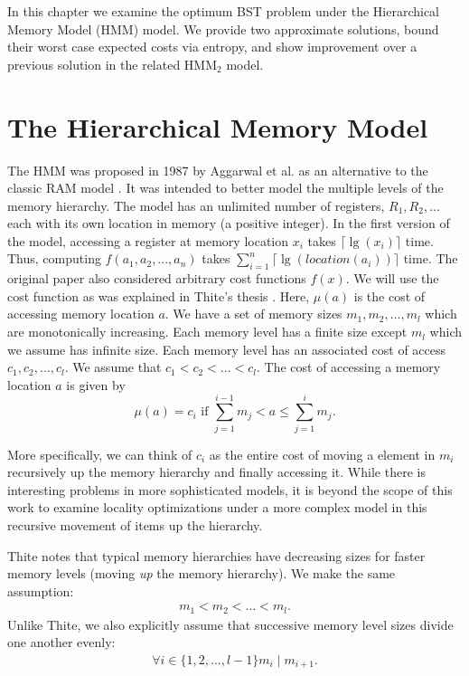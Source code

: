 \documentclass[letterpaper,12pt,titlepage,oneside,final]{book}
\theoremstyle{plain}
\begin{document}
In this chapter we examine the optimum BST problem under the Hierarchical Memory Model (HMM) model. We provide two approximate solutions, bound their worst case expected costs via entropy, and show improvement over a previous solution in the related HMM$_2$ model. 
 
\section{The Hierarchical Memory Model}\label{The Hierarchical Memory Model}

The HMM was proposed in 1987 by Aggarwal et al. as an alternative to the classic RAM model \cite{aggarwal1987model}. It was intended to better model the multiple levels of the memory hierarchy. The model has an unlimited number of registers, $R_1, R_2, ...$ each with its own location in memory (a positive integer). In the first version of the model, accessing a register at memory location $x_i$ takes $\lceil \lg(x_i) \rceil$ time. Thus, computing $f(a_1, a_2, ..., a_n)$ takes $\sum_{i=1}^{n} \lceil \lg(location(a_i)) \rceil$ time. The original paper also considered arbitrary cost functions $f(x)$. We will use the cost function as was explained in Thite's thesis \cite{thite2008optimum}. Here, $\mu (a)$ is the cost of accessing memory location $a$. We have a set of memory sizes $m_1, m_2, ..., m_l$ which are monotonically increasing. Each memory level has a finite size except $m_l$ which we assume has infinite size. Each memory level has an associated cost of access $c_1, c_2, ..., c_l$. We assume that $c_1 < c_2 < ... < c_l$. The cost of accessing a memory location $a$ is given by
\begin{equation}
\mu (a) = c_i \text{ if } \sum_{j = 1}^{i-1}m_j  < a \leq \sum_{j = 1}^{i}m_j.
\end{equation}

\noindent More specifically, we can think of $c_i$ as the entire cost of moving a element in $m_i$ recursively up the memory hierarchy and finally accessing it. While there is interesting problems in more sophisticated models, it is beyond the scope of this work to examine locality optimizations under a more complex model in this recursive movement of items up the hierarchy.

Thite notes that typical memory hierarchies have decreasing sizes for faster memory levels (moving \textit{up} the memory hierarchy). We make the same assumption:
\begin{align*}
m_1 < m_2 < ... < m_l.
\end{align*}
Unlike Thite, we also explicitly assume that successive memory level sizes divide one another evenly:
\begin{align*}
\forall i \in  \{1,2,...,l-1\} m_i \mid m_{i+1}.
\end{align*}
\end{document}
